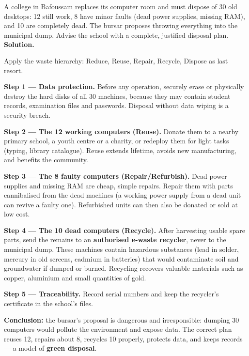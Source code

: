 \documentclass[11pt]{article}
\begin{document}
\begin{exoresolu}
A college in Bafoussam replaces its computer room and must dispose of 30 old desktops: 12 still work, 8 have minor faults (dead power supplies, missing RAM), and 10 are completely dead. The bursar proposes throwing everything into the municipal dump. Advise the school with a complete, justified disposal plan.
\tcblower
\textbf{Solution.}\par
Apply the waste hierarchy: Reduce, Reuse, Repair, Recycle, Dispose as last resort.\par
\textbf{Step 1 — Data protection.} Before any operation, securely erase or physically destroy the hard disks of all 30 machines, because they may contain student records, examination files and passwords. Disposal without data wiping is a security breach.\par
\textbf{Step 2 — The 12 working computers (Reuse).} Donate them to a nearby primary school, a youth centre or a charity, or redeploy them for light tasks (typing, library catalogue). Reuse extends lifetime, avoids new manufacturing, and benefits the community.\par
\textbf{Step 3 — The 8 faulty computers (Repair/Refurbish).} Dead power supplies and missing RAM are cheap, simple repairs. Repair them with parts cannibalised from the dead machines (a working power supply from a dead unit can revive a faulty one). Refurbished units can then also be donated or sold at low cost.\par
\textbf{Step 4 — The 10 dead computers (Recycle).} After harvesting usable spare parts, send the remains to an \textbf{authorised e-waste recycler}, never to the municipal dump. These machines contain hazardous substances (lead in solder, mercury in old screens, cadmium in batteries) that would contaminate soil and groundwater if dumped or burned. Recycling recovers valuable materials such as copper, aluminium and small quantities of gold.\par
\textbf{Step 5 — Traceability.} Record serial numbers and keep the recycler's certificate in the school's files.\par
\textbf{Conclusion:} the bursar's proposal is dangerous and irresponsible: dumping 30 computers would pollute the environment and expose data. The correct plan reuses 12, repairs about 8, recycles 10 properly, protects data, and keeps records — a model of \textbf{green disposal}.
\end{exoresolu}
\end{document}
